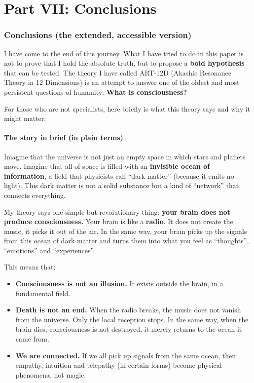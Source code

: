 \part*{Part VII: Conclusions}

\section{Conclusions (the extended, accessible version)}
I have come to the end of this journey. What I have tried to do in this paper is not to prove that I hold the absolute truth, but to propose a \textbf{bold hypothesis} that can be tested. The theory I have called ART-12D (Akashic Resonance Theory in 12 Dimensions) is an attempt to answer one of the oldest and most persistent questions of humanity: \textbf{What is consciousness?}

For those who are not specialists, here briefly is what this theory says and why it might matter:

\subsection{The story in brief (in plain terms)}
Imagine that the universe is not just an empty space in which stars and planets move. Imagine that all of space is filled with an \textbf{invisible ocean of information}, a field that physicists call ``dark matter'' (because it emits no light). This dark matter is not a solid substance but a kind of ``network'' that connects everything.

My theory says one simple but revolutionary thing: \textbf{your brain does not produce consciousness.} Your brain is like a \textbf{radio}. It does not create the music, it picks it out of the air. In the same way, your brain picks up the signals from this ocean of dark matter and turns them into what you feel as ``thoughts'', ``emotions'' and ``experiences''.

This means that:
\begin{itemize}
    \item \textbf{Consciousness is not an illusion.} It exists outside the brain, in a fundamental field.
    \item \textbf{Death is not an end.} When the radio breaks, the music does not vanish from the universe. Only the local reception stops. In the same way, when the brain dies, consciousness is not destroyed, it merely returns to the ocean it came from.
    \item \textbf{We are connected.} If we all pick up signals from the same ocean, then empathy, intuition and telepathy (in certain forms) become physical phenomena, not magic.
\end{itemize}


